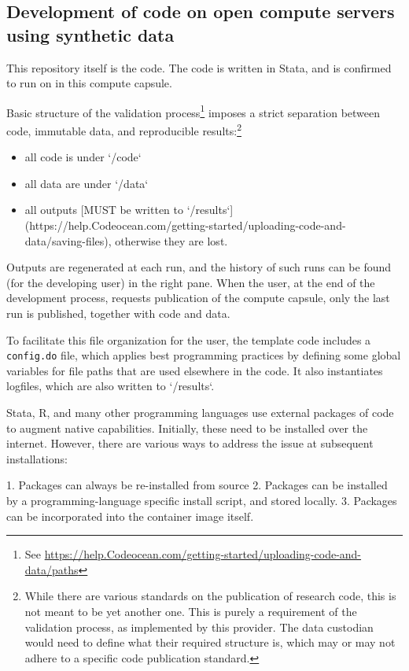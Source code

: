 \documentclass[]{hdsr}
\begin{document}
\subsection{Development of code on open compute servers using synthetic data}

This repository itself is the code. The code is written in Stata, and is confirmed to run on in this compute capsule.

Basic structure of the validation process\footnote{See \url{https://help.Codeocean.com/getting-started/uploading-code-and-data/paths}} imposes a strict separation between code, immutable data, and reproducible results:\footnote{While there are various standards on the publication of research code, this is not meant to be yet another one. This is purely a requirement of the validation process, as implemented by this provider. The data custodian would need to define what their required structure is, which may or may not adhere to a specific code publication standard.}

\begin{itemize}
    \item all code is under `/code`
    \item all data are under `/data`
    \item all outputs [MUST be written to `/results`](https://help.Codeocean.com/getting-started/uploading-code-and-data/saving-files), otherwise they are lost.
\end{itemize}

Outputs are regenerated at each run, and the history of such runs can be found (for the developing user) in the right pane. When the user, at the end of the development process, requests publication of the compute capsule, only the last run is published, together with code and data.

To facilitate this file organization for the user, the template code includes a \texttt{config.do} file, which applies best programming practices by defining some global variables for file paths that are used elsewhere in the code. It also instantiates logfiles, which are also written to `/results`.



Stata, R, and many other programming languages use external packages of code to augment native capabilities. Initially, these need to be installed over the internet. However, there are various ways to address the issue at subsequent installations:

1. Packages can always be re-installed from source
2. Packages can be installed by a programming-language specific install script, and stored locally. 
3. Packages can be incorporated into the container image itself.
\end{document}

